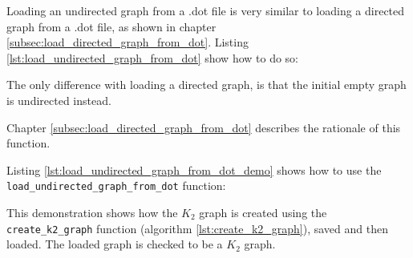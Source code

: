 Loading an undirected graph from a .dot file is very similar to loading a
directed graph from a .dot file, as shown in chapter 
\ref{subsec:load_directed_graph_from_dot}.
Listing \ref{lst:load_undirected_graph_from_dot}
show how to do so:



The only difference with loading a directed graph, is that the initial empty
graph is undirected instead.

Chapter \ref{subsec:load_directed_graph_from_dot}
describes the rationale of this function.

Listing \ref{lst:load_undirected_graph_from_dot_demo}
shows how to use the \verb;load_undirected_graph_from_dot; function:



This demonstration shows how the $K_{2}$ graph is created using the 
\verb;create_k2_graph; function (algorithm \ref{lst:create_k2_graph}), 
saved and then loaded. The loaded graph is checked to be a $K_{2}$ graph.

